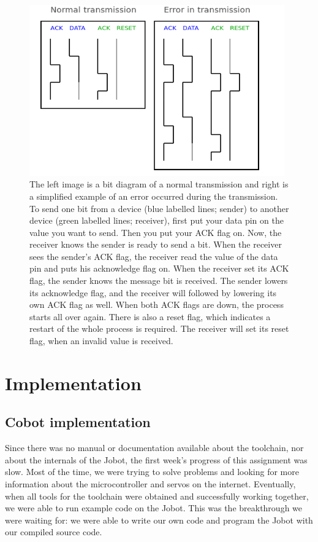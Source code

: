 \documentclass[a4paper,10pt]{article} %
\begin{document}
\begin{figure}[H]
\label{fig:handshaking}
\centering
\includegraphics[width=11cm]{img/handshaking.png}
\caption{The left image is a bit diagram of a normal transmission and right is a
simplified example of an error occurred during the transmission. To send one bit
from a device (blue labelled lines; sender) to another device (green labelled
lines; receiver), first put your data pin on the value you want to send. Then
you put your ACK flag on. Now, the receiver knows the sender is ready to send a
bit.  When the receiver sees the sender's ACK flag, the receiver read the value
of the data pin and puts his acknowledge flag on. When the receiver set its ACK
flag, the sender knows the message bit is received. The sender lowers its
acknowledge flag, and the receiver will followed by lowering its own ACK flag as
well. When both ACK flags are down, the process starts all over again. There is
also a reset flag, which indicates a restart of the whole process is required.
The receiver will set its reset flag, when an invalid value is received.}
\end{figure}



\pagebreak

\section{Implementation} %
\label{sec:Implementation}

\subsection{Cobot implementation} %
\label{sub:Cobot implementation}

Since there was no manual or documentation available about the toolchain, nor
about the internals of the Jobot, the first week's progress of this assignment
was slow. Most of the time, we were trying to solve problems and looking for
more information about the microcontroller and servos on the internet.
Eventually, when all tools for the toolchain were obtained and successfully
working together, we were able to run example code on the Jobot. This was the
breakthrough we were waiting for: we were able to write our own code and program
the Jobot with our compiled source code.
\end{document}
